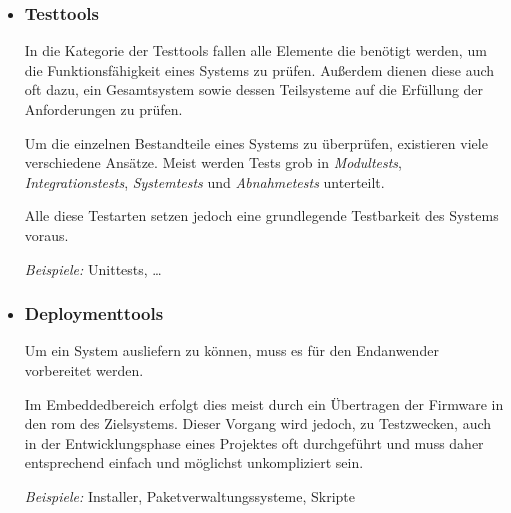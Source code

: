\begin{itemize}
  Der Entwickler ist durch das Setzen von Breakpoints\footnote{Willkürliche,
  vom Entwickler vor dem Start der Software zu setzende, "`Haltepunkte"' im
  Programmablauf.} mittels des Debuggers in der Lage, eine Software in einen
  definierten Zustand zu bringen. Anschließend kann er den weiteren
  Programmablauf schrittweise ausführen lassen (single-stepping) oder mitunter
  auch geringfügige Änderung am Speicher des Systems vornehmen.
  
  Debugger sind in integrierten Systemen oft auf eine hohe Hardwareunterstützung
  angewiesen. In \autoref{subs:hwdebugger} wird dies näher beschrieben.
  
   \emph{Beispiele:} GDB , IDB (Intel Debugger), Valgrind
  \item \subsubsection*{Testtools} In die Kategorie der Testtools fallen
  alle Elemente die benötigt werden, um die Funktionsfähigkeit eines Systems zu
  prüfen. Außerdem dienen diese auch oft dazu, ein Gesamtsystem sowie dessen
  Teilsysteme auf die Erfüllung der Anforderungen zu prüfen.
  
  Um die einzelnen Bestandteile eines Systems zu überprüfen, existieren viele
  verschiedene Ansätze. Meist werden Tests grob in \emph{Modultests},
  \emph{Integrationstests}, \emph{Systemtests} und \emph{Abnahmetests}
  unterteilt.
  
  Alle diese Testarten setzen jedoch eine grundlegende Testbarkeit des Systems
  voraus.
  
  \emph{Beispiele:} Unittests, \ldots  
  \item \subsubsection*{Deploymenttools}\label{subs:deployment} Um ein System
  ausliefern zu können, muss es für den Endanwender vorbereitet werden.
  
  Im Embeddedbereich erfolgt dies meist durch ein Übertragen der
  Firmware in den \gls{rom} des Zielsystems. Dieser Vorgang wird jedoch, zu
  Testzwecken, auch in der Entwicklungsphase eines Projektes oft durchgeführt
  und muss daher entsprechend einfach und möglichst unkompliziert sein.
  
  \emph{Beispiele:} Installer, Paketverwaltungssysteme, Skripte
\end{itemize}

